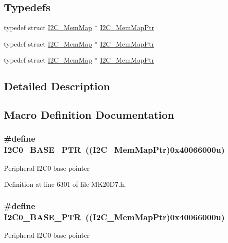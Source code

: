 \subsection*{Typedefs}
\begin{DoxyCompactItemize}
\item 
typedef struct \hyperlink{struct_i2_c___mem_map}{I2\+C\+\_\+\+Mem\+Map} $\ast$ \hyperlink{group___i2_c___peripheral_ga9902bc02a12982d0c37ec011b4dd89f0}{I2\+C\+\_\+\+Mem\+Map\+Ptr}
\item 
typedef struct \hyperlink{struct_i2_c___mem_map}{I2\+C\+\_\+\+Mem\+Map} $\ast$ \hyperlink{group___i2_c___peripheral_ga9902bc02a12982d0c37ec011b4dd89f0}{I2\+C\+\_\+\+Mem\+Map\+Ptr}
\item 
typedef struct \hyperlink{struct_i2_c___mem_map}{I2\+C\+\_\+\+Mem\+Map} $\ast$ \hyperlink{group___i2_c___peripheral_ga9902bc02a12982d0c37ec011b4dd89f0}{I2\+C\+\_\+\+Mem\+Map\+Ptr}
\end{DoxyCompactItemize}


\subsection{Detailed Description}


\subsection{Macro Definition Documentation}
\subsubsection[{\texorpdfstring{I2\+C0\+\_\+\+B\+A\+S\+E\+\_\+\+P\+TR}{I2C0_BASE_PTR}}]{\setlength{\rightskip}{0pt plus 5cm}\#define I2\+C0\+\_\+\+B\+A\+S\+E\+\_\+\+P\+TR~(({\bf I2\+C\+\_\+\+Mem\+Map\+Ptr})0x40066000u)}\hypertarget{group___i2_c___peripheral_ga6db92fda81fa3b6a1c8c6a85e66d51a0}{}\label{group___i2_c___peripheral_ga6db92fda81fa3b6a1c8c6a85e66d51a0}
Peripheral I2\+C0 base pointer 

Definition at line 6301 of file M\+K20\+D7.\+h.

\subsubsection[{\texorpdfstring{I2\+C0\+\_\+\+B\+A\+S\+E\+\_\+\+P\+TR}{I2C0_BASE_PTR}}]{\setlength{\rightskip}{0pt plus 5cm}\#define I2\+C0\+\_\+\+B\+A\+S\+E\+\_\+\+P\+TR~(({\bf I2\+C\+\_\+\+Mem\+Map\+Ptr})0x40066000u)}\hypertarget{group___i2_c___peripheral_ga6db92fda81fa3b6a1c8c6a85e66d51a0}{}\label{group___i2_c___peripheral_ga6db92fda81fa3b6a1c8c6a85e66d51a0}
Peripheral I2\+C0 base pointer 

